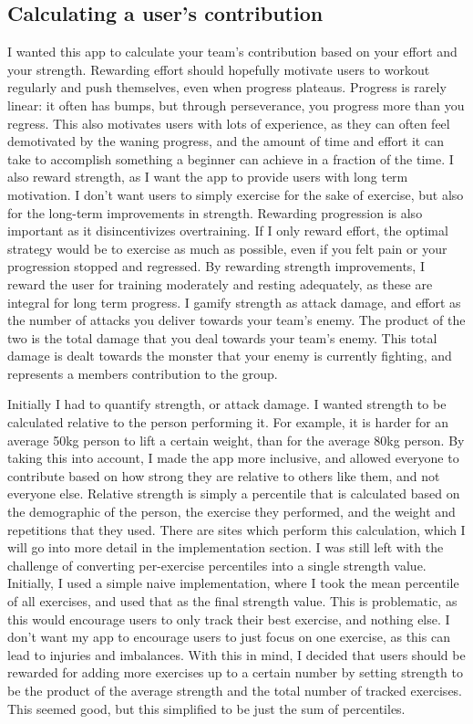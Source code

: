 \documentclass{l4proj}
\begin{document}
\subsection{Calculating a user's contribution}
I wanted this app to calculate your team's contribution based on your effort and your strength. Rewarding effort should hopefully motivate users to workout regularly and push themselves, even when progress plateaus. Progress is rarely linear: it often has bumps, but through perseverance, you progress more than you regress. This also motivates users with lots of experience, as they can often feel demotivated by the waning progress, and the amount of time and effort it can take to accomplish something a beginner can achieve in a fraction of the time. I also reward strength, as I want the app to provide users with long term motivation. I don't want users to simply exercise for the sake of exercise, but also for the long-term improvements in strength. Rewarding progression is also important as it disincentivizes overtraining. If I only reward effort, the optimal strategy would be to exercise as much as possible, even if you felt pain or your progression stopped and regressed. By rewarding strength improvements, I reward the user for training moderately and resting adequately, as these are integral for long term progress. I gamify strength as attack damage, and effort as the number of attacks you deliver towards your team's enemy. The product of the two is the total damage that you deal towards your team's enemy. This total damage is dealt towards the monster that your enemy is currently fighting, and represents a members contribution to the group.

Initially I had to quantify strength, or attack damage. I wanted strength to be calculated relative to the person performing it. For example, it is harder for an average 50kg person to lift a certain weight, than for the average 80kg person. By taking this into account, I made the app more inclusive, and allowed everyone to contribute based on how strong they are relative to others like them, and not everyone else. Relative strength is simply a percentile that is calculated based on the demographic of the person, the exercise they performed, and the weight and repetitions that they used. There are sites which perform this calculation, which I will go into more detail in the implementation section. I was still left with the challenge of converting per-exercise percentiles into a single strength value. Initially, I used a simple naive implementation, where I took the mean percentile of all exercises, and used that as the final strength value. This is problematic, as this would encourage users to only track their best exercise, and nothing else. I don't want my app to encourage users to just focus on one exercise, as this can lead to injuries and imbalances. With this in mind, I decided that users should be rewarded for adding more exercises up to a certain number by setting strength to be the product of the average strength and the total number of tracked exercises. This seemed good, but this simplified to be just the sum of percentiles.
\end{document}

